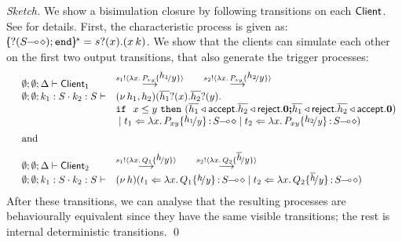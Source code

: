 \begin{proof}[Sketch]
	\noi We show a bisimulation closure by following transitions on each $\mathsf{Client}$.
	See  for details.
	First, the characteristic process is given as:
	$[\!\!(? (S\!\! \multimap\! \diamond) ; \mathtt{end})\!\!]^{s} = s ? (x) . (x\, {k})$.
	We show that the clients can simulate each other on
	the first two output transitions, that also generate the trigger
	processes:
%
\[
	\begin{array}{lll}
		&	\es; \es; \Delta \proves \Client_1
		&
			\by{\bactout{s_1}{\abs{x}{P_{xy} \subst{h_1}{y}}}}
			\qquad
			\by{\bactout{s_2}{\abs{x}{P_{xy} \subst{h_2}{y}}}}
		\\
		&	\es; \es; k_1: S \cat k_2: S \proves
		&
			\newsp{h_1, h_2}{\binp{\dual{h_1}}{x} \binp{\dual{h_2}}{y}
		\\
		&
		&	\If\ x \leq y\ \Then (\bsel{\dual{h_1}}{\accept} \bsel{\dual{h_2}}{\reject} \inact
			\Else \bsel{\dual{h_1}}{\reject} \bsel{\dual{h_2}}{\accept} \inact)
		\\
		&
		&	\Par \ftrigger{t_1}{\abs{x}{P_{xy} \subst{h_1}{y}}}{\lhot{S}} \Par \ftrigger{t_2}{\abs{x}{P_{xy} \subst{h_2}{y}}}{\lhot{S}}}
		\\[2mm]
		& \mbox{and}
		\\[2mm]
		&	\es; \es; \Delta \proves \Client_2
		&
			\by{\bactout{s_1}{\abs{x}{Q_1 \subst{h}{y}}}}
			\qquad
			\by{\bactout{s_2}{\abs{x}{Q_2 \subst{\dual{h}}{y}}}}
		\\
		&	\es; \es; k_1: S \cat k_2: S \proves & \newsp{h}{
			\ftrigger{t_1}{\abs{x}{Q_1 \subst{h}{y}}}{\lhot{S}} \Par \ftrigger{t_2}{\abs{x}{Q_2 \subst{\dual{h}}{y}}}{\lhot{S}}}
	\end{array}
\]
	\noi 
	After these transitions, 
	we can analyse that 
	the resulting processes are behaviourally equivalent
	since they have the same visible transitions; the rest 
	is internal deterministic transitions. 
	\qed
\end{proof}


